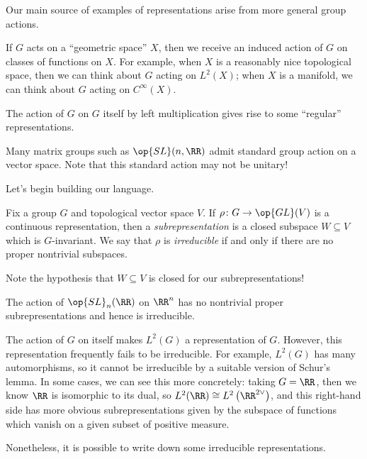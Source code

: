 \documentclass[../notes.tex]{subfiles}
\begin{document}
Our main source of examples of representations arise from more general group actions.
\begin{example}
	If $G$ acts on a ``geometric space'' $X$, then we receive an induced action of $G$ on classes of functions on $X$. For example, when $X$ is a reasonably nice topological space, then we can think about $G$ acting on $L^2(X)$; when $X$ is a manifold, we can think about $G$ acting on $C^\infty(X)$.
\end{example}
\begin{example}
	The action of $G$ on $G$ itself by left multiplication gives rise to some ``regular'' representations.
\end{example}
\begin{example}
	Many matrix groups such as $\op{SL}(n,\RR)$ admit standard group action on a vector space. Note that this standard action may not be unitary!
\end{example}
Let's begin building our language.
\begin{defihelper}  
	Fix a group $G$ and topological vector space $V$. If $\rho\colon G\to\op{GL}(V)$ is a continuous representation, then a \textit{subrepresentation} is a closed subspace $W\subseteq V$ which is $G$-invariant. We say that $\rho$ is \textit{irreducible} if and only if there are no proper nontrivial subspaces.
\end{defihelper}
Note the hypothesis that $W\subseteq V$ is closed for our subrepresentations!
\begin{example}
	The action of $\op{SL}_n(\RR)$ on $\RR^n$ has no nontrivial proper subrepresentations and hence is irreducible.
\end{example}
\begin{remark}
	The action of $G$ on itself makes $L^2(G)$ a representation of $G$. However, this representation frequently fails to be irreducible. For example, $L^2(G)$ has many automorphisms, so it cannot be irreducible by a suitable version of Schur's lemma. In some cases, we can see this more concretely: taking $G=\RR$, then we know $\RR$ is isomorphic to its dual, so $L^2(\RR)\cong L^2\left(\RR^{2\lor}\right)$, and this right-hand side has more obvious subrepresentations given by the subspace of functions which vanish on a given subset of positive measure.
\end{remark}
Nonetheless, it is possible to write down some irreducible representations.
\end{document}
